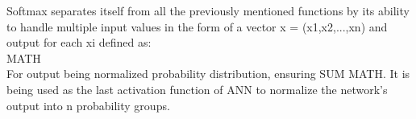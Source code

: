 
Softmax separates itself from all the previously mentioned functions by its ability to handle multiple input values in the form of a vector x = (x1,x2,...,xn) and output for each xi defined as:\\

MATH\\

For output being normalized probability distribution, ensuring SUM MATH.\cite{lipton2015critical} It is being used as the last activation function of ANN to normalize the network's output into n probability groups.
